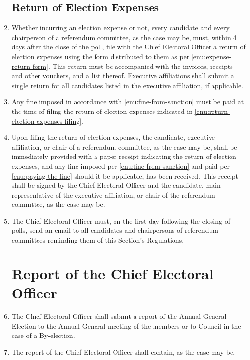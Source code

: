 \documentclass[oneside]{book}
\begin{document}
\begin{enumerate}
\section{\label{Return_of_Election_Expenses}Return of Election Expenses }
\item \label{enu:return-election-expenses-filing}Whether incurring an election
expense or not, every candidate and every chairperson of a referendum
committee, as the case may be, must, within 4 days after the close
of the poll, file with the Chief Electoral Officer a return of election
expenses using the form distributed to them as per \autoref{enu:expense-return-form}.
This return must be accompanied with the invoices, receipts and other
vouchers, and a list thereof. Executive affiliations shall submit
a single return for all candidates listed in the executive affiliation,
if applicable. 
\item \label{enu:paying-the-fine}Any fine imposed in accordance with
\autoref{enu:fine-from-sanction} must be paid at the time of filing the
return of election expenses indicated in \autoref{enu:return-election-expenses-filing}. 
\item Upon filing the return of election expenses, the candidate, executive
affiliation, or chair of a referendum committee, as the case may be,
shall be immediately provided with a paper receipt indicating the
return of election expenses, and any fine imposed per \autoref{enu:fine-from-sanction}
and paid per \autoref{enu:paying-the-fine} should it be applicable,
has been received. This receipt shall be signed by the Chief Electoral
Officer and the candidate, main representative of the executive affiliation,
or chair of the referendum committee, as the case may be. 
\item The Chief Electoral Officer must, on the first day following the closing
of polls, send an email to all candidates and chairpersons of referendum
committees reminding them of this Section's Regulations. 

\chapter{\label{Report_of_the_Chief_Electoral_Officer}Report of the Chief
Electoral Officer }
\item The Chief Electoral Officer shall submit a report of the Annual General
Election to the Annual General meeting of the members or to Council
in the case of a By-election. 
\item The report of the Chief Electoral Officer shall contain, as the case
may be, 


\end{enumerate}
\end{document}
